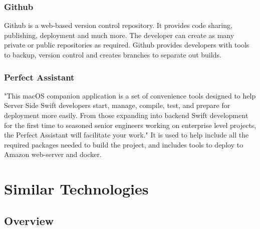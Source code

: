 \subsubsection{Github}

Github \cite{github} is a web-based version control repository. It provides code sharing, publishing, deployment and much more. The developer can create as many private or public repositories as required. Github provides developers with tools to backup, version control and creates branches to separate out builds.

\subsubsection{Perfect Assistant}
"This macOS companion application is a set of convenience tools designed to help Server Side Swift developers start, manage, compile, test, and prepare for deployment more easily. From those expanding into backend Swift development for the first time to seasoned senior engineers working on enterprise level projects, the Perfect Assistant will facilitate your work." \cite{perfectAssist} It is used to help include all the required packages needed to build the project, and includes tools to deploy to Amazon web-server and docker.



\section{Similar Technologies}

\subsection{Overview}

